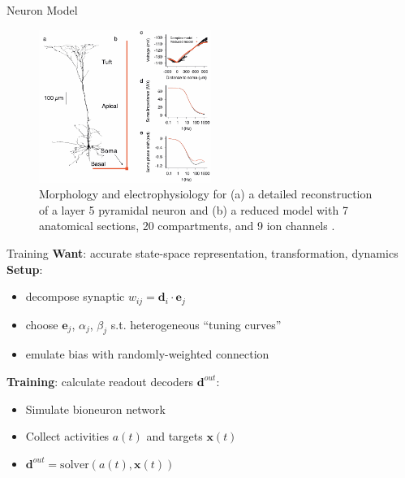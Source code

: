 \documentclass[aspectratio=169]{beamer}
\begin{document}
\begin{frame}{Neuron Model}
  \begin{figure}
  \centering
  \includegraphics[width=0.5\textwidth]{media/bahl_neuron.png}
  \caption{Morphology and electrophysiology for (a) a detailed reconstruction of a layer 5 pyramidal neuron and (b) a reduced model with 7 anatomical sections, 20 compartments, and 9 ion channels \cite{bahl2012}.}
  \end{figure}
\end{frame}

\begin{frame}{Training}
\textbf{Want}: accurate state-space representation, transformation, dynamics \\
\pause
\vspace{0.5cm}
\textbf{Setup}: 
  \begin{itemize}
  \item decompose synaptic $w_{ij} = \mathbf{d}_i \cdot \mathbf{e}_j$
  \item choose $\mathbf{e}_j$, $\alpha_j$, $\beta_j$ s.t. heterogeneous ``tuning curves''
  \item emulate bias with randomly-weighted connection
  \end{itemize}
\vspace{0.5cm}
\pause
\textbf{Training}: calculate readout decoders $\mathbf{d}^{out}$:
  \begin{itemize}
  \item Simulate bioneuron network
  \item Collect activities $a(t)$ and targets $\mathbf{x}(t)$
  \item $\mathbf{d}^{out} = \mathrm{solver} (a(t), \mathbf{x}(t))$
  \end{itemize}
\end{frame}
\end{document}
